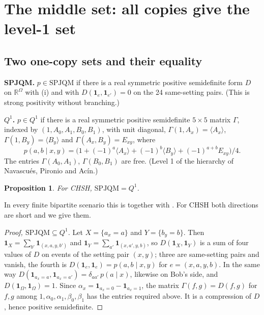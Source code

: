 \documentclass[11pt,a4paper]{article}
\newtheorem{proposition}[theorem]{Proposition}
\theoremstyle{definition}
\theoremstyle{remark}
\newcommand{\ind}[1]{\mathbf{1}_{#1}}
\newcommand{\SPJQM}{\mathrm{SPJQM}}
\begin{document}
\section{The middle set: all copies give the level-1 set}

\subsection{Two one-copy sets and their equality}

\noindent\textbf{SPJQM.} $p \in \SPJQM$ if there is a real symmetric positive semidefinite form $D$ on $\mathbb{R}^{\Omega}$ with (i) and with $D(\ind{e}, \ind{e'}) = 0$ on the 24 same-setting pairs. (This is strong positivity without branching.)

\medskip
\noindent\textbf{$Q^1$.} $p \in Q^1$ if there is a real symmetric positive semidefinite $5 \times 5$ matrix $\Gamma$, indexed by $(1, A_0, A_1, B_0, B_1)$, with unit diagonal, $\Gamma(1, A_x) = \langle A_x \rangle$, $\Gamma(1, B_y) = \langle B_y \rangle$ and $\Gamma(A_x, B_y) = E_{xy}$, where
\[
  p(a, b \mid x, y) = \bigl(1 + (-1)^a \langle A_x \rangle + (-1)^b \langle B_y \rangle + (-1)^{a+b} E_{xy}\bigr)/4 .
\]
The entries $\Gamma(A_0, A_1)$, $\Gamma(B_0, B_1)$ are free. (Level 1 of the hierarchy of Navascu\'es, Pironio and Ac\'in.)

\begin{proposition}\label{p:sp-q1}
For CHSH, $\SPJQM = Q^1$.
\end{proposition}

In every finite bipartite scenario this is \cite[Theorem 15]{DHW} together with \cite[Theorem 3.2]{SP}. For CHSH both directions are short and we give them.

\begin{proof}[Proof, $\SPJQM \subseteq Q^1$]
Let $X = \{a_x = a\}$ and $Y = \{b_y = b\}$. Then $\ind{X} = \sum_{b'} \ind{(x,a,y,b')}$ and $\ind{Y} = \sum_{a'} \ind{(x,a',y,b)}$, so $D(\ind{X}, \ind{Y})$ is a sum of four values of $D$ on events of the setting pair $(x, y)$; three are same-setting pairs and vanish, the fourth is $D(\ind{e}, \ind{e}) = p(a, b \mid x, y)$ for $e = (x, a, y, b)$. In the same way $D(\ind{a_x=a}, \ind{a_x=a'}) = \delta_{aa'}\, p(a \mid x)$, likewise on Bob's side, and $D(\ind{\Omega}, \ind{\Omega}) = 1$. Since $\alpha_x = \ind{a_x=0} - \ind{a_x=1}$, the matrix $\Gamma(f, g) = D(f, g)$ for $f, g$ among $1, \alpha_0, \alpha_1, \beta_0, \beta_1$ has the entries required above. It is a compression of $D$, hence positive semidefinite.
\end{proof}
\end{document}
